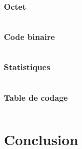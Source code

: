 \documentclass[12pt,a4paper]{article}
\begin{document}
\subsubsection{Octet}
    \inputminted[breaklines]{c}{../programme/src/tests/testOctet.c}
\subsubsection{Code binaire}
    \inputminted[breaklines]{c}{../programme/src/tests/testCodeBinaire.c}
\subsubsection{Statistiques}
    \inputminted[breaklines]{c}{../programme/src/tests/testStats.c}
\subsubsection{Table de codage}
    \inputminted[breaklines]{c}{../programme/src/tests/testTable.c}

\newpage

\section{Conclusion}


\end{document}
